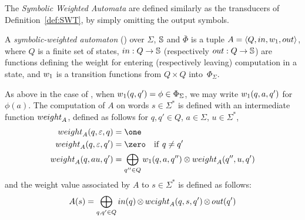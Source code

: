 \noindent
The \emph{Symbolic Weighted Automata} %
are defined similarly as the transducers of Definition~\ref{def:SWT}, 
by simply omitting the output symbols.
%
%
\begin{definition} \label{def:SWA}
A \emph{symbolic-weighted automaton} (\SWA)
over $\Sigma$, $\mathbb{S}$ and $\bar\Phi$
is a tuple
$A = \< Q, \init, {\wei_1}, \final >$,
where $Q$ is a finite set of states, 
$\mathsf{in} : Q \to \Semiring$ %
(respectively $\mathsf{out} : Q \to \Semiring$)  %
are functions defining the weight for entering
(respectively leaving) computation in a state, 
and ${\wei_1}$ is a transition functions 
from $Q \times Q$ into~$\Phi_{\Sigma}$.
\end{definition}
%      
\noindent
As above in the case of \SWT, 
when $\wei_1(q, q') = \phi \in \Phi_\Sigma$, 
we may write $\wei_1(q, a, q')$ for~$\phi(a)$. 
The computation of $A$ on words $s \in \Sigma^*$
is defined with an intermediate function $\weight_A$, 
defined as follows for $q, q' \in Q$, $a \in \Sigma$, $u \in \Sigma^*$,
%
\begin{align}
\weight_A(q, \varepsilon, q) & = \one\\ %
\weight_A(q, \varepsilon, q') & = \zero \quad \mathrm{if~} q \neq q'\nonumber\\
\weight_A(q, au, q') & =  \displaystyle\bigoplus_{q'' \in Q} 
    \wei_{1}(q, a, q'') \otimes \weight_A(q'', u, q')\nonumber
\label{eq:SWA-weight}
\end{align}
%
\noindent
and the weight value associated by $A$ to 
$s \in \Sigma^*$ is defined as follows: %
\begin{equation}
A(s)  = 
\displaystyle\bigoplus_{q, q' \in Q} \init(q) 
\mathop{\otimes} \weight_A(q, s, q') \mathop{\otimes} \final(q') 
\label{eq:SWA-value}
\end{equation}


%
      
